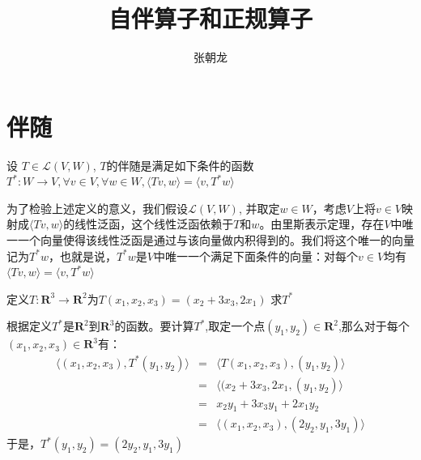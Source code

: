 \documentclass[10pt,a4paper,UTF8]{article}
\author{张朝龙}
\date{}
\title{自伴算子和正规算子}
\begin{document}
\maketitle
\tableofcontents
{}

\section{伴随}
\label{sec:org88be3ee}


\begin{definition}
设 \(T\in \mathcal{L}(V,W)\), \(T\)的伴随是满足如下条件的函数\(T^{*}:W\to V,\forall v\in V , \forall w\in W, \langle Tv,w \rangle = \langle v,T^{*}w \rangle\)
\end{definition}

为了检验上述定义的意义，我们假设\(\mathcal{L}(V,W)\), 并取定\(w\in W\)，考虑\(V\)上将\(v\in V\)映射成\(\langle Tv,w \rangle\)的线性泛函，这个线性泛函依赖于\(T\)和\(w\)。由里斯表示定理，存在\(V\)中唯一一个向量使得该线性泛函是通过与该向量做内积得到的。我们将这个唯一的向量记为\(T^{*}w\)，也就是说，\(T^{*}w\)是\(V\)中唯一一个满足下面条件的向量：对每个\(v\in V\)均有\(\langle Tv,w \rangle = \langle v,T^{*}w \rangle\)

\begin{tikzinstance}
定义\(T:\mathbf{R}^{3}\to \mathbf{R}^{2}\)为\(T(x_{1},x_{2},x_{3}) = (x_{2}+3x_{3},2x_{1})\) 求\(T^{*}\)

根据定义\(T^{*}\)是\(\mathbf{R}^{2}\)到\(\mathbf{R}^{3}\)的函数。要计算\(T^{*}\),取定一个点\((y_{1},y_{2})\in \mathbf{R}^{2}\),那么对于每个\((x_{1},x_{2},x_{3})\in \mathbf{R}^{3}\)有：
\begin{eqnarray}
\label{eq:1}
\langle (x_{1},x_{2},x_{3}),T^{*}(y_{1},y_{2}) \rangle &=& \langle T(x_{1},x_{2},x_{3}),(y_{1},y_{2}) \rangle \\
&=& \langle (x_{2}+3x_{3},2x_{1},(y_{1},y_{2}) \rangle \\
&=& x_{2}y_{1} + 3x_{3}y_{1} + 2x_{1}y_{2} \\
&=& \langle (x_{1},x_{2},x_{3}) , (2y_{2},y_{1},3y_{1}) \rangle
\end{eqnarray}
于是，\(T^{*}(y_{1},y_{2}) = (2y_{2},y_{1},3y_{1})\)
\end{tikzinstance}
\end{document}
